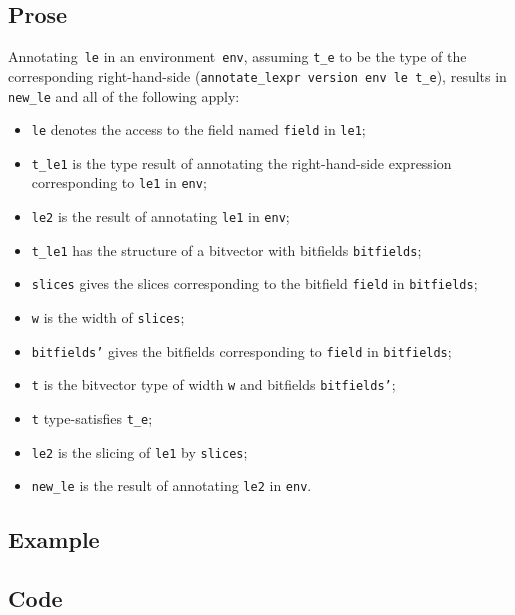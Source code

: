 \documentclass{book}
\begin{document}
    \subsection{Prose}
   Annotating~\texttt{le} in an environment~\texttt{env}, assuming
\texttt{t\_e} to be the type of the corresponding right-hand-side
(\texttt{annotate\_lexpr version env le t\_e}), results in \texttt{new\_le} and
all of the following apply:
   \begin{itemize}
   \item \texttt{le} denotes the access to the field named \texttt{field} in \texttt{le1};
   \item \texttt{t\_le1} is the type result of annotating the right-hand-side expression corresponding to \texttt{le1} in \texttt{env};
   \item \texttt{le2} is the result of annotating \texttt{le1} in \texttt{env};
   \item \texttt{t\_le1} has the structure of a bitvector with bitfields \texttt{bitfields};
   \item \texttt{slices} gives the slices corresponding to the bitfield \texttt{field} in
      \texttt{bitfields};
   \item \texttt{w} is the width of \texttt{slices};
   \item \texttt{bitfields'} gives the bitfields corresponding to \texttt{field} in \texttt{bitfields};
   \item \texttt{t} is the bitvector type of width \texttt{w} and bitfields \texttt{bitfields'};
   \item \texttt{t} type-satisfies \texttt{t\_e};
   \item \texttt{le2} is the slicing of \texttt{le1} by \texttt{slices};
   \item \texttt{new\_le} is the result of annotating \texttt{le2} in \texttt{env}.
   \end{itemize}

  \subsection{Example}

  \subsection{Code}
\end{document}
